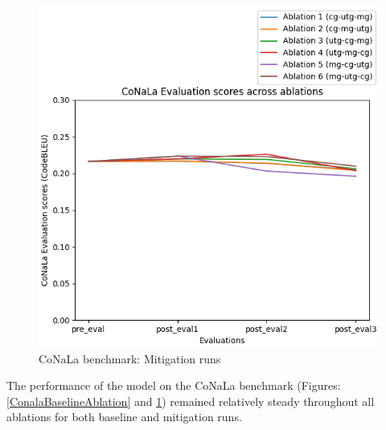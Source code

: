 \begin{figure}[H]
\begin{minipage}{0.45\textwidth}
        \centering
        \includegraphics[width=1.1\textwidth]{Figures/results/code_mitigation_graphs/conala/seed_averaged_conala_eval_mitigation.png} %
        \captionsetup{width=1.1\textwidth}
        \caption{CoNaLa benchmark: Mitigation runs}
        \label{ConalaMitigationAblation}
    \end{minipage}
\end{figure}
The performance of the model on the CoNaLa benchmark (Figures: \ref{ConalaBaselineAblation} and \ref{ConalaMitigationAblation}) remained relatively steady throughout all ablations for both baseline and mitigation runs.

